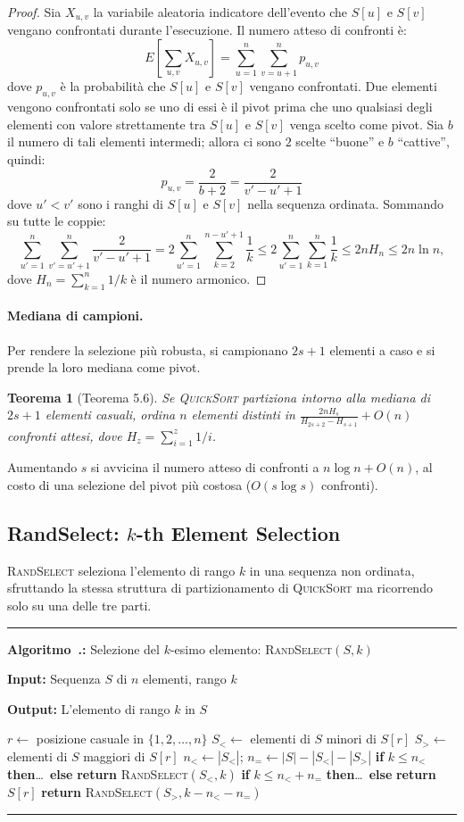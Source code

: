 \documentclass[12pt, a4paper, oneside]{book}
\newcounter{algocf}[chapter]
\renewcommand{\thealgocf}{\thechapter.\arabic{algocf}}
\newenvironment{algorithm}[1][H]{%
  \refstepcounter{algocf}%
  \par\medskip\noindent\rule{\linewidth}{0.4pt}\par\smallskip
}{%
  \par\smallskip\noindent\rule{\linewidth}{0.4pt}\par\medskip
}
\newcommand{\algcaption}[1]{\noindent\textbf{Algoritmo~\thealgocf:} #1\par\smallskip}
\newcommand{\KwIn}[1]{\noindent\textbf{Input:} #1\par}
\newcommand{\KwOut}[1]{\noindent\textbf{Output:} #1\par}
\newcommand{\Return}[1]{\noindent\textbf{return} #1}
\newcommand{\eSe}[1]{\noindent\textbf{if} #1 \textbf{then}\ldots\ \textbf{else}}
\theoremstyle{plain}
\newtheorem{teorema}{Teorema}[chapter]
\theoremstyle{definition}
\theoremstyle{remark}
\begin{document}
\begin{proof}
Sia $X_{u,v}$ la variabile aleatoria indicatore dell'evento che $S[u]$ e $S[v]$ vengano confrontati durante l'esecuzione. Il numero atteso di confronti è:
\[
E\!\left[\sum_{u,v} X_{u,v}\right] = \sum_{u=1}^{n}\sum_{v=u+1}^{n} p_{u,v}
\]
dove $p_{u,v}$ è la probabilità che $S[u]$ e $S[v]$ vengano confrontati. Due elementi vengono confrontati solo se uno di essi è il pivot prima che uno qualsiasi degli elementi con valore strettamente tra $S[u]$ e $S[v]$ venga scelto come pivot. Sia $b$ il numero di tali elementi intermedi; allora ci sono $2$ scelte ``buone'' e $b$ ``cattive'', quindi:
\[
p_{u,v} = \frac{2}{b+2} = \frac{2}{v' - u' + 1}
\]
dove $u' < v'$ sono i ranghi di $S[u]$ e $S[v]$ nella sequenza ordinata. Sommando su tutte le coppie:
\[
\sum_{u'=1}^{n}\sum_{v'=u'+1}^{n} \frac{2}{v'-u'+1} = 2\sum_{u'=1}^{n}\sum_{k=2}^{n-u'+1}\frac{1}{k} \le 2\sum_{u'=1}^{n}\sum_{k=1}^{n}\frac{1}{k} \le 2n H_n \le 2n\ln n,
\]
dove $H_n = \sum_{k=1}^n 1/k$ è il numero armonico.
\end{proof}

\paragraph{Mediana di campioni.}
Per rendere la selezione più robusta, si campionano $2s+1$ elementi a caso e si prende la loro mediana come pivot.

\begin{teorema}[Teorema 5.6]
Se \textsc{QuickSort} partiziona intorno alla mediana di $2s+1$ elementi casuali, ordina $n$ elementi distinti in $\frac{2nH_s}{H_{2s+2} - H_{s+1}} + O(n)$ confronti attesi, dove $H_z = \sum_{i=1}^{z} 1/i$.
\end{teorema}

Aumentando $s$ si avvicina il numero atteso di confronti a $n\log n + O(n)$, al costo di una selezione del pivot più costosa ($O(s\log s)$ confronti).

\subsection{RandSelect: $k$-th Element Selection}

\textsc{RandSelect} seleziona l'elemento di rango $k$ in una sequenza non ordinata, sfruttando la stessa struttura di partizionamento di \textsc{QuickSort} ma ricorrendo solo su una delle tre parti.

\begin{algorithm}[H]
\algcaption{Selezione del $k$-esimo elemento: \textsc{RandSelect}$(S, k)$}
\KwIn{Sequenza $S$ di $n$ elementi, rango $k$}
\KwOut{L'elemento di rango $k$ in $S$}
$r \leftarrow$ posizione casuale in $\{1, 2, \ldots, n\}$\;
$S_{<} \leftarrow$ elementi di $S$ minori di $S[r]$\;
$S_{>} \leftarrow$ elementi di $S$ maggiori di $S[r]$\;
$n_{<} \leftarrow |S_{<}|$; \quad $n_{=} \leftarrow |S| - |S_{<}| - |S_{>}|$\;
\eSe{$k \le n_{<}$}{
  \Return{\textsc{RandSelect}$(S_{<}, k)$}\;
}{
  \eSe{$k \le n_{<} + n_{=}$}{
    \Return{$S[r]$}\;
  }{
    \Return{\textsc{RandSelect}$(S_{>}, k - n_{<} - n_{=})$}\;
  }
}
\end{algorithm}
\end{document}
